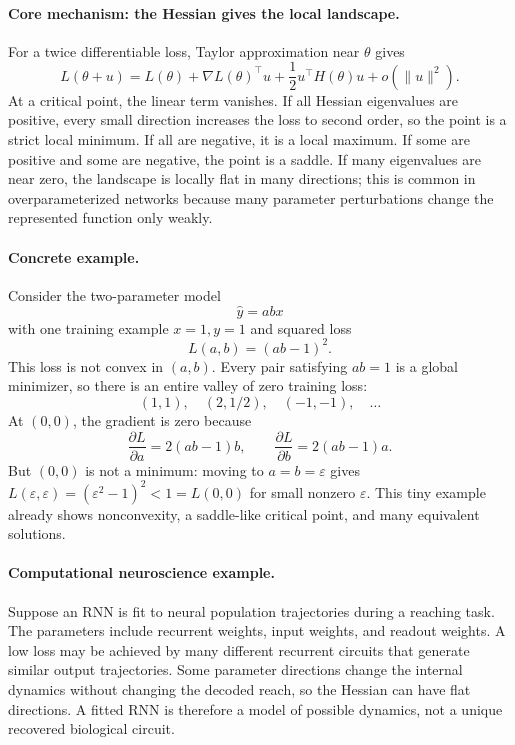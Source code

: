 \paragraph{Core mechanism: the Hessian gives the local landscape.}
For a twice differentiable loss, Taylor approximation near \(\theta\) gives
\[
L(\theta+u)
=L(\theta)+\nabla L(\theta)^\top u+\frac12 u^\top H(\theta)u+o(\|u\|^2).
\]
At a critical point, the linear term vanishes. If all Hessian eigenvalues are positive, every small direction increases the loss to second order, so the point is a strict local minimum. If all are negative, it is a local maximum. If some are positive and some are negative, the point is a saddle. If many eigenvalues are near zero, the landscape is locally flat in many directions; this is common in overparameterized networks because many parameter perturbations change the represented function only weakly.

\paragraph{Concrete example.}
Consider the two-parameter model
\[
\widehat y=abx
\]
with one training example \(x=1,y=1\) and squared loss
\[
L(a,b)=(ab-1)^2.
\]
This loss is not convex in \((a,b)\). Every pair satisfying \(ab=1\) is a global minimizer, so there is an entire valley of zero training loss:
\[
(1,1),\quad (2,1/2),\quad (-1,-1),\quad \ldots
\]
At \((0,0)\), the gradient is zero because
\[
\frac{\partial L}{\partial a}=2(ab-1)b,\qquad
\frac{\partial L}{\partial b}=2(ab-1)a.
\]
But \((0,0)\) is not a minimum: moving to \(a=b=\varepsilon\) gives \(L(\varepsilon,\varepsilon)=(\varepsilon^2-1)^2<1=L(0,0)\) for small nonzero \(\varepsilon\). This tiny example already shows nonconvexity, a saddle-like critical point, and many equivalent solutions.

\paragraph{Computational neuroscience example.}
Suppose an RNN is fit to neural population trajectories during a reaching task. The parameters include recurrent weights, input weights, and readout weights. A low loss may be achieved by many different recurrent circuits that generate similar output trajectories. Some parameter directions change the internal dynamics without changing the decoded reach, so the Hessian can have flat directions. A fitted RNN is therefore a model of possible dynamics, not a unique recovered biological circuit.

